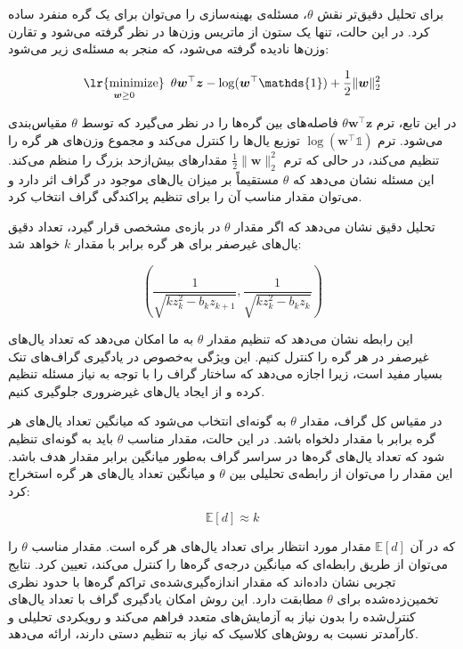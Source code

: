 \documentclass[10pt,twocolumn,a4paper]{article}
\newcommand\minimize[1]{\mathop{\text{\lr{minimize}}}\limits_{#1}\ }
\begin{document}
	برای تحلیل دقیق‌تر نقش \( \theta \)، مسئله‌ی بهینه‌سازی را می‌توان برای یک گره منفرد ساده کرد. در این حالت، تنها یک ستون از ماتریس وزن‌ها در نظر گرفته می‌شود و تقارن وزن‌ها نادیده گرفته می‌شود، که منجر به مسئله‌ی زیر می‌شود:

	\[
		\minimize{\bm{w} \geq 0} \theta \bm{w}^\top \bm{z} - \log(\bm{w}^\top \mathds{1}) + \frac{1}{2} \|\bm{w}\|_2^2
	\]

	در این تابع، ترم \( \theta \bm{w}^\top \bm{z} \) فاصله‌های بین گره‌ها را در نظر می‌گیرد که توسط \( \theta \) مقیاس‌بندی می‌شود. ترم \( \log(\bm{w}^\top \mathds{1}) \) توزیع یال‌ها را کنترل می‌کند و مجموع وزن‌های هر گره را تنظیم می‌کند، در حالی که ترم \( \frac{1}{2} \|\bm{w}\|_2^2 \) مقدارهای بیش‌ازحد بزرگ را منظم می‌کند. این مسئله نشان می‌دهد که \( \theta \) مستقیماً بر میزان یال‌های موجود در گراف اثر دارد و می‌توان مقدار مناسب آن را برای تنظیم پراکندگی گراف انتخاب کرد.

	تحلیل دقیق نشان می‌دهد که اگر مقدار \( \theta \) در بازه‌ی مشخصی قرار گیرد، تعداد دقیق یال‌های غیرصفر برای هر گره برابر با مقدار \( k \) خواهد شد:

	\begin{equation}
		\left( \frac{1}{\sqrt{k z_k^2 - b_k z_{k+1}}}, \frac{1}{\sqrt{k z_k^2 - b_k z_k}} \right)
	\end{equation}

	این رابطه نشان می‌دهد که تنظیم مقدار \( \theta \) به ما امکان می‌دهد که تعداد یال‌های غیرصفر در هر گره را کنترل کنیم. این ویژگی به‌خصوص در یادگیری گراف‌های تنک بسیار مفید است، زیرا اجازه می‌دهد که ساختار گراف را با توجه به نیاز مسئله تنظیم کرده و از ایجاد یال‌های غیرضروری جلوگیری کنیم.

	در مقیاس کل گراف، مقدار \( \theta \) به گونه‌ای انتخاب می‌شود که میانگین تعداد یال‌های هر گره برابر با مقدار دلخواه باشد. در این حالت، مقدار مناسب \( \theta \) باید به گونه‌ای تنظیم شود که تعداد یال‌های گره‌ها در سراسر گراف به‌طور میانگین برابر مقدار هدف باشد. این مقدار را می‌توان از رابطه‌ی تحلیلی بین \( \theta \) و میانگین تعداد یال‌های هر گره استخراج کرد:

	\[
		\mathbb{E}[d] \approx k
	\]

	که در آن \( \mathbb{E}[d] \) مقدار مورد انتظار برای تعداد یال‌های هر گره است. مقدار مناسب \( \theta \) را می‌توان از طریق رابطه‌ای که میانگین درجه‌ی گره‌ها را کنترل می‌کند، تعیین کرد. نتایج تجربی نشان داده‌اند که مقدار اندازه‌گیری‌شده‌ی تراکم گره‌ها با حدود نظری تخمین‌زده‌شده برای \( \theta \) مطابقت دارد. این روش امکان یادگیری گراف با تعداد یال‌های کنترل‌شده را بدون نیاز به آزمایش‌های متعدد فراهم می‌کند و رویکردی تحلیلی و کارآمدتر نسبت به روش‌های کلاسیک که نیاز به تنظیم دستی دارند، ارائه می‌دهد.
\end{document}
